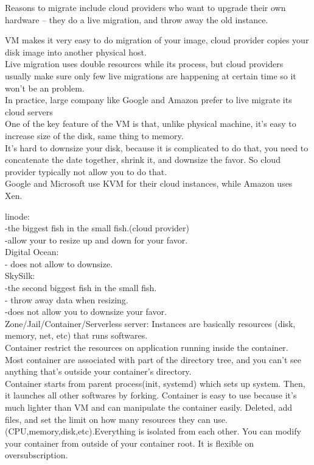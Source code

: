 \documentclass[fancy,11pt,titlestyle=display]{style/elegantbook}
\begin{document}
\par Reasons to migrate include cloud providers who want to upgrade their own hardware -- they do a live migration, and throw away the old instance.

VM makes it very easy to do migration of your image, cloud provider copies your disk image  into another physical host. \\
Live migration uses double resources while its process, but cloud providers usually make sure only few live migrations are happening at certain time so it won't be an problem.\\
In practice, large company like Google and Amazon prefer to live migrate its cloud servers \\
One of the key feature of the VM is that, unlike physical machine, it's easy to increase size of the disk, same thing to memory.\\
It's hard to downsize your disk, because it is complicated to do that, you need to concatenate the date together, shrink it, and downsize the favor. So cloud provider typically not allow you to do that.\\

Google and Microsoft use KVM for their cloud instances, while Amazon uses Xen.

linode:\\
-the biggest fish in the small fish.(cloud provider)\\
-allow your to resize up and down for your favor.\\
Digital Ocean:\\
- does not allow to downsize.\\
SkySilk:\\
-the second biggest fish in the small fish.\\
- throw away data when resizing.\\
-does not allow you to downsize your favor.\\

Zone/Jail/Container/Serverless server:
Instances are basically resources (disk, memory, net, etc) that runs softwares.\\
Container restrict the resources on application running inside the container.\\
Most container are associated with part of the directory tree, and you can't see anything that's outside your container's directory.\\
Container starts from parent process(init, systemd) which sets up system. Then, it launches all other softwares by forking.
Container is easy to use because it's much lighter than VM and can manipulate the container easily. Deleted, add files, and set the limit on how many resources they can use.(CPU,memory,disk,etc).Everything is isolated from each other. You can modify your container from outside of your container root. It is flexible on oversubscription.\\
\end{document}
